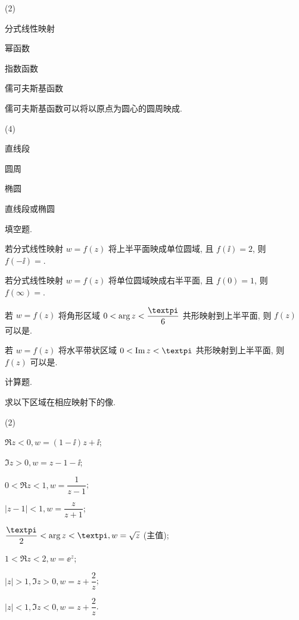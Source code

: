 \begin{homework}
\begin{homework}
    \begin{exchoice}(2)
      \item 分式线性映射
      \item 幂函数
      \item 指数函数
      \item 儒可夫斯基函数
    \end{exchoice}
    \item 儒可夫斯基函数可以将以原点为圆心的圆周映成\fillbrace{}.
    \begin{exchoice}(4)
      \item 直线段
      \item 圆周
      \item 椭圆
      \item 直线段或椭圆
    \end{exchoice}
  \end{homework}
  \item 填空题.
  \begin{homework}
    \item 若分式线性映射 $w=f(z)$ 将上半平面映成单位圆域, 且 $f(\ii)=2$, 则 $f(-\ii)=$\fillblank[7mm]{}.
    \item 若分式线性映射 $w=f(z)$ 将单位圆域映成右半平面, 且 $f(0)=1$, 则 $f(\infty)=$\fillblank[7mm]{}.
    \item 若 $w=f(z)$ 将角形区域 $0<\arg z<\dfrac\cpi6$ 共形映射到上半平面, 则 $f(z)$ 可以是\fillblank{}.
    \item 若 $w=f(z)$ 将水平带状区域 $0<\Im z<\cpi$ 共形映射到上半平面, 则 $f(z)$ 可以是\fillblank{}.
  \end{homework}
  \item 计算题.
  \begin{homework}
    \item 求以下区域在相应映射下的像.
    \begin{subhomework}(2)
      \item $\Re z<0, w=(1-\ii)z+\ii$;
      \item $\Im z>0, w=z-1-\ii$;
      \item $0<\Re z<1, w=\dfrac1{z-1}$;
      \item $|z-1|<1, w=\dfrac z{z+1}$;
      \item $\dfrac\cpi2<\arg z<\cpi, w=\sqrt z$ (主值);
      \item $1<\Re z<2, w=\ee^z$;
      \item $|z|>1, \Im z>0, w=z+\dfrac 2z$;
      \item $|z|<1, \Im z<0, w=z+\dfrac 2z$.
    \end{subhomework}

\end{homework}
\end{homework}
